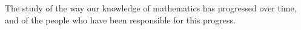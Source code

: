 The study of the way our knowledge of mathematics has progressed over time, and
of the people who have been responsible for this progress.